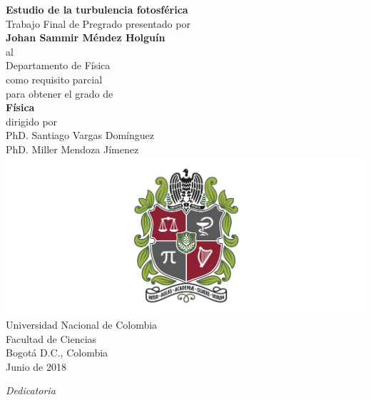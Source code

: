 \documentclass[12pt,letterpaper,oneside]{book}
\theoremstyle{plain}
\theoremstyle{definition}
\theoremstyle{remark}
\begin{document}
\thispagestyle{empty}
\label{Portada}
\begin{center}
\textbf{{\LARGE Estudio de la turbulencia fotosférica}}\\[2cm]

Trabajo Final de Pregrado presentado por\\[0.7cm]

\textbf{{\LARGE Johan Sammir Méndez Holguín}}\\[1cm]

al\\[4mm]

{\Large Departamento de Física}\\[1.5cm]

como requisito parcial\\
para obtener el grado de\\[1 cm]

\textbf{{\Large Física}}\\[1.5cm]

dirigido por\\
PhD. Santiago Vargas Domínguez\\
PhD. Miller Mendoza Jímenez\\[1cm]




\includegraphics[scale=.10]{escudo}\\
{\Large Universidad Nacional de Colombia}\\[2mm]
{\Large Facultad de Ciencias}\\[2mm]
Bogot\'a D.C., Colombia\\[2mm]
Junio de 2018

\end{center}

\newpage\null\thispagestyle{empty}\newpage

\newpage
{}
\thispagestyle{empty}
\vspace*{9cm}
\begin{flushright}
\textit{Dedicatoria\\ }
\end{flushright}
\end{document}
